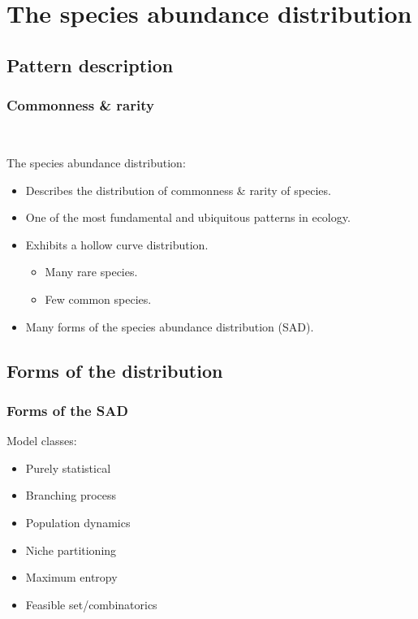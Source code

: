 \documentclass[14pt]{beamer}
\begin{document}
\section{The species abundance distribution}
\subsection{Pattern description}
\begin{frame}[t]{}
\frametitle{Commonness \& rarity}
~\\
\begin{large}
The species abundance distribution:
\end{large}
\begin{itemize}
\item Describes the distribution of commonness \& rarity of species.
\item One of the most fundamental and ubiquitous patterns in ecology.
\item Exhibits a hollow curve distribution.
\begin{itemize}
\item Many rare species.
\item Few common species.
~\\
\end{itemize}
\item Many forms of the species abundance distribution (SAD).
\end{itemize}
\end{frame}

\subsection{Forms of the distribution}
\begin{frame}
\frametitle{Forms of the SAD}
\begin{large}
Model classes:
\end{large}
\begin{itemize}
\item Purely statistical
\item Branching process
\item Population dynamics
\item Niche partitioning
\item Maximum entropy
\item Feasible set/combinatorics
\end{itemize}
\end{frame}
\end{document}
